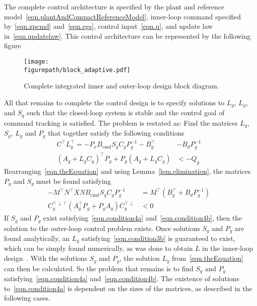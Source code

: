 \documentclass[journal]{IEEEtran}
\newcommand{\figurepath}{../fig}
\theoremstyle{innercustomthm}
\begin{document}
  The complete control architecture is specified by the plant and reference model\ \eqref{eqn.plantAndCompactReferenceModel}, inner-loop command specified by\ \eqref{eqn.zpcmd} and\ \eqref{eqn.egs}, control input\ \eqref{eqn.u}, and update law in\ \eqref{eqn.updatelaw}.
  This control architecture can be represented by the following figure
  \begin{figure}[H]
    \begin{center}
      \texttt{[image: \\figurepath/block\_adaptive.pdf]}
      \vspace{-0.1in}
      \caption{Complete integrated inner and outer-loop design block diagram.\label{fig.innerAndOuterLoopDansOutputFeedback}}
    \end{center}
  \end{figure}

  All that remains to complete the control design is to specify solutions to $L_{y}$, $L_{g}$, and $S_{g}$ such that the closed-loop system is stable and the control goal of command tracking is satisfied.
  The problem is restated as: Find the matrices $L_{y}$, $S_{g}$, $L_{g}$ and $P_{g}$ that together satisfy the following conditions
  \begin{align}
    \label{eqn.theEquation}
    C^{\top}L_{y}^{\top} = - P_{x}B_{\text{cmd}}S_{g}C_{g}P_{g}^{-1} - B_{g}^{\top} & - B_{d}P_{g}^{-1} \\
    \label{eqn.condition3b}
    (A_{g}+L_{g}C_{g})^{\top}P_{g}+P_{g}(A_{g}+L_{g}C_{g}) &< -Q_{g}
  \end{align}
  Rearranging\ \eqref{eqn.theEquation} and using Lemma~\ref{lem.elimination},  the matrices $P_{g}$ and $S_{g}$ must be found satisfying
  {%
    \small
    \begin{align}
      \label{eqn.condition4a}
      -M^{\top}N^{\top}XNB_{\text{cmd}}S_{g}C_{g}P_{g}^{-1} &= M^{\top}(B_{g}^{\top} + B_{d}P_{g}^{-1}) \\
      \label{eqn.condition4b}
      C_{g}^{\top\perp\top} (A_{g}^{\top}P_{g} + P_{g}A_{g}) C_{g}^{\top\perp} &< 0
    \end{align}
  }%
  If $S_{g}$ and $P_{g}$ exist satisfying\ \eqref{eqn.condition4a} and\ \eqref{eqn.condition4b}, then the solution to the outer-loop control problem exists.
  Once solutions $S_{g}$ and $P_{g}$ are found analytically, an $L_{g}$ satisfying\ \eqref{eqn.condition3b} is guaranteed to exist, which can be simply found numerically, as was done to obtain $L$ in the inner-loop design\ \cite{wiese.gnc.2015, wiese.jgcd.2015}.
  With the solutions $S_{g}$ and $P_{g}$, the solution $L_{y}$ from\ \eqref{eqn.theEquation} can then be calculated.
  So the problem that remains is to find $S_{g}$ and $P_{g}$ satisfying\ \eqref{eqn.condition4a} and\ \eqref{eqn.condition4b}.
  The existence of solutions to\ \eqref{eqn.condition4a} is dependent on the sizes of the matrices, as described in the following cases.
\end{document}
